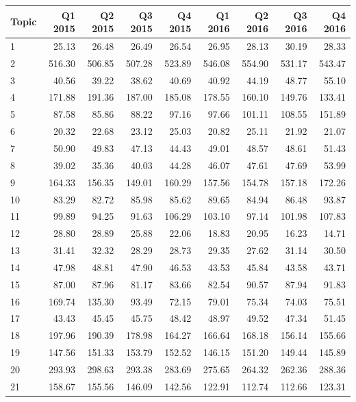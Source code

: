 \begin{table}[]
			\small
	\begin{tabular}{l|rrrrrrrr}
		Topic & Q1 2015 & Q2 2015 & Q3 2015 & Q4 2015 & Q1 2016 & Q2 2016 & Q3 2016 & Q4 2016 \\
		\hline
		1 & 25.13 & 26.48 & 26.49 & 26.54 & 26.95 & 28.13 & 30.19 & 28.33 \\
		2 & 516.30 & 506.85 & 507.28 & 523.89 & 546.08 & 554.90 & 531.17 & 543.47 \\
		3 & 40.56 & 39.22 & 38.62 & 40.69 & 40.92 & 44.19 & 48.77 & 55.10 \\
		4 & 171.88 & 191.36 & 187.00 & 185.08 & 178.55 & 160.10 & 149.76 & 133.41 \\
		5 & 87.58 & 85.86 & 88.22 & 97.16 & 97.66 & 101.11 & 108.55 & 151.89 \\
		6 & 20.32 & 22.68 & 23.12 & 25.03 & 20.82 & 25.11 & 21.92 & 21.07 \\
		7 & 50.90 & 49.83 & 47.13 & 44.43 & 49.01 & 48.57 & 48.61 & 51.43 \\
		8 & 39.02 & 35.36 & 40.03 & 44.28 & 46.07 & 47.61 & 47.69 & 53.99 \\
		9 & 164.33 & 156.35 & 149.01 & 160.29 & 157.56 & 154.78 & 157.18 & 172.26 \\
		10 & 83.29 & 82.72 & 85.98 & 85.62 & 89.65 & 84.94 & 86.48 & 93.87 \\
		11 & 99.89 & 94.25 & 91.63 & 106.29 & 103.10 & 97.14 & 101.98 & 107.83 \\
		12 & 28.80 & 28.89 & 25.88 & 22.06 & 18.83 & 20.95 & 16.23 & 14.71 \\
		13 & 31.41 & 32.32 & 28.29 & 28.73 & 29.35 & 27.62 & 31.14 & 30.50 \\
		14 & 47.98 & 48.81 & 47.90 & 46.53 & 43.53 & 45.84 & 43.58 & 43.71 \\
		15 & 87.00 & 87.96 & 81.17 & 83.66 & 82.54 & 90.57 & 87.94 & 91.83 \\
		16 & 169.74 & 135.30 & 93.49 & 72.15 & 79.01 & 75.34 & 74.03 & 75.51 \\
		17 & 43.43 & 45.45 & 45.75 & 48.42 & 48.97 & 49.52 & 47.34 & 51.45 \\
		18 & 197.96 & 190.39 & 178.98 & 164.27 & 166.64 & 168.18 & 156.14 & 155.66 \\
		19 & 147.56 & 151.33 & 153.79 & 152.52 & 146.15 & 151.20 & 149.44 & 145.89 \\
		20 & 293.93 & 298.63 & 293.38 & 283.69 & 275.65 & 264.32 & 262.36 & 288.36 \\
		21 & 158.67 & 155.56 & 146.09 & 142.56 & 122.91 & 112.74 & 112.66 & 123.31 \\

\end{tabular}
\end{table}
